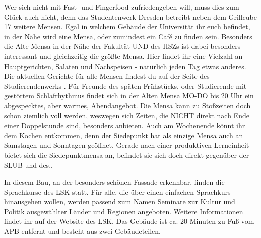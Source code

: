 Wer sich nicht mit Fast- und Fingerfood zufriedengeben will, muss dies zum Glück auch nicht, denn das Studentenwerk Dresden betreibt neben dem Grillcube 17 weitere Mensen.
Egal in welchem Gebäude der Universität ihr euch befindet, in der Nähe wird eine Mensa, oder zumindest ein Café zu finden sein.
Besonders die Alte Mensa in der Nähe der Fakultät UND des HSZs ist dabei besonders interessant und gleichzeitig die größte Mensa.
Hier findet ihr eine Vielzahl an Hauptgerichten, Salaten und Nachspeisen - natürlich jeden Tag etwas anderes.
Die aktuellen Gerichte für alle Mensen findest du auf der Seite des Studierendenwerks .
Für Freunde des späten Frühstücks, oder Studierende mit gestörtem Schlafrhythmus findet sich in der Alten Mensa MO-DO bis 20 Uhr ein abgespecktes, aber warmes, Abendangebot.
Die Mensa kann zu Stoßzeiten doch schon ziemlich voll werden, weswegen sich Zeiten, die NICHT direkt nach Ende einer Doppelstunde sind, besonders anbieten.
Auch am Wochenende könnt ihr dem Kochen entkommen, denn der Siedepunkt hat als einzige Mensa auch an Samstagen und Sonntagen geöffnet.
Gerade nach einer produktiven Lerneinheit bietet sich die Siedepunktmensa an, befindet sie sich doch direkt gegenüber der SLUB und des..


In diesem Bau, an der besonders schönen Fassade erkennbar, finden die Sprachkurse des LSK statt.
Für alle, die über einen einfachen Sprachkurs hinausgehen wollen, werden passend zum Namen Seminare zur Kultur und Politik ausgewählter Länder und Regionen angeboten.
Weitere Informationen findet ihr auf der Website des LSK.
Das Gebäude ist ca. 20 Minuten zu Fuß vom APB entfernt und besteht aus zwei Gebäudeteilen.
